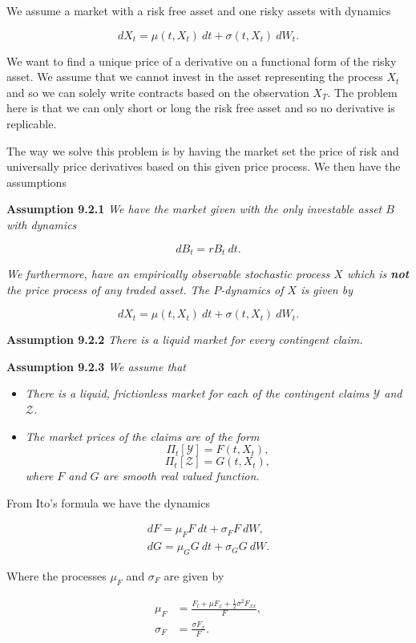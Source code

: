 \documentclass[
]{article}
\providecommand{\tightlist}{%
  \setlength{\itemsep}{0pt}\setlength{\parskip}{0pt}}
\begin{document}
We assume a market with a risk free asset and one risky assets with
dynamics

\[
dX_t=\mu(t,X_t)\ dt+\sigma(t,X_t)\ dW_t.\tag{9.1}
\]

We want to find a unique price of a derivative on a functional form of
the risky asset. We assume that we cannot invest in the asset
representing the process \(X_t\) and so we can solely write contracts
based on the observation \(X_T\). The problem here is that we can only
short or long the risk free asset and so no derivative is replicable.

The way we solve this problem is by having the market set the price of
risk and universally price derivatives based on this given price
process. We then have the assumptions

\textbf{Assumption 9.2.1} \emph{We have the market given with the only
investable asset \(B\) with dynamics}

\[
dB_t=rB_t\ dt.\tag{9.2}
\]

\emph{We furthermore, have an empirically observable stochastic process
\(X\) which is \textbf{not} the price process of any traded asset. The
\(P\)-dynamics of \(X\) is given by}

\[
dX_t=\mu(t,X_t)\ dt+\sigma(t,X_t)\ dW_t.
\]

\textbf{Assumption 9.2.2} \emph{There is a liquid market for every
contingent claim.}

\textbf{Assumption 9.2.3} \emph{We assume that}

\begin{itemize}
\tightlist
\item
  \emph{There is a liquid, frictionless market for each of the
  contingent claims \(\mathcal{Y}\) and \(\mathcal{Z}\).}
\item
  \emph{The market prices of the claims are of the form}
  \[ \Pi_t[\mathcal{Y}] = F(t,X_t),\]
  \[ \Pi_t[\mathcal{Z}] = G(t,X_t),\] \emph{where \(F\) and \(G\) are
  smooth real valued function.}
\end{itemize}

From Ito's formula we have the dynamics

\begin{align*}
dF=\mu_F F\ dt+\sigma_F F\ dW,\tag{9.4}\\
dG=\mu_G G\ dt+\sigma_G G\ dW.\tag{9.5}
\end{align*}

Where the processes \(\mu_F\) and \(\sigma_F\) are given by

\begin{align*}
\mu_F&=\frac{F_t+\mu F_x+\frac{1}{2}\sigma^2 F_{xx}}{F},\\
\sigma_F&=\frac{\sigma F_x}{F}.
\end{align*}
\end{document}
